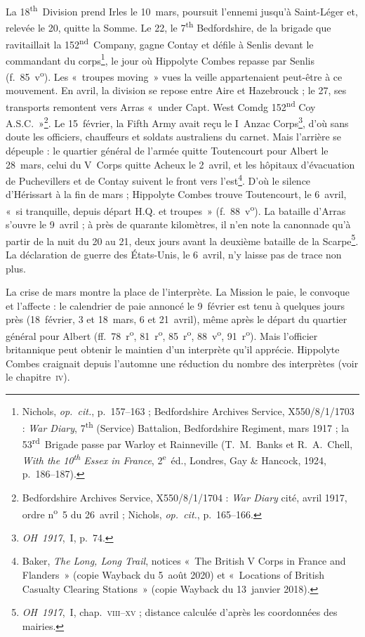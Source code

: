 La 18\textsuperscript{th}~Division prend Irles le 10~mars, poursuit l'ennemi jusqu'à Saint-Léger et, relevée le 20, quitte la Somme. Le 22, le 7\textsuperscript{th} Bedfordshire, de la brigade que ravitaillait la 152\textsuperscript{nd}~Company, gagne Contay et défile à Senlis devant le commandant du corps\footnote{Nichols, \textit{op.~cit.}, p.~157--163 ; Bedfordshire Archives Service, X550/8/1/1703 : \textit{War Diary}, 7\textsuperscript{th} (Service) Battalion, Bedfordshire Regiment, mars 1917 ; la 53\textsuperscript{rd}~Brigade passe par Warloy et Rainneville (T.~M.~Banks et R.~A.~Chell, \textit{With the 10\textsuperscript{th} Essex in France}, 2\textsuperscript{e}~éd., Londres, Gay \& Hancock, 1924, p.~186--187).}, le jour où Hippolyte Combes repasse par Senlis (f.~85~v\textsuperscript{o}). Les «~troupes moving~» vues la veille appartenaient peut-être à ce mouvement. En avril, la division se repose entre Aire et Hazebrouck ; le 27, ses transports remontent vers Arras «~under Capt. West Comdg 152\textsuperscript{nd} Coy A.S.C.~»\footnote{Bedfordshire Archives Service, X550/8/1/1704 : \textit{War Diary} cité, avril 1917, ordre n\textsuperscript{o}~5 du 26~avril ; Nichols, \textit{op.~cit.}, p.~165--166.}. Le 15~février, la Fifth Army avait reçu le I~Anzac Corps\footnote{\textit{OH~1917},~I, p.~74.}, d'où sans doute les officiers, chauffeurs et soldats australiens du carnet. Mais l'arrière se dépeuple : le quartier général de l'armée quitte Toutencourt pour Albert le 28~mars, celui du V~Corps quitte Acheux le 2~avril, et les hôpitaux d'évacuation de Puchevillers et de Contay suivent le front vers l'est\footnote{Baker, \textit{The Long, Long Trail}, notices «~The British V Corps in France and Flanders~» (copie Wayback du 5~août 2020) et «~Locations of British Casualty Clearing Stations~» (copie Wayback du 13~janvier 2018).}. D'où le silence d'Hérissart à la fin de mars ; Hippolyte Combes trouve Toutencourt, le 6~avril, «~si tranquille, depuis départ H.Q. et troupes~» (f.~88~v\textsuperscript{o}). La bataille d'Arras s'ouvre le 9~avril ; à près de quarante kilomètres, il n'en note la canonnade qu'à partir de la nuit du 20 au 21, deux jours avant la deuxième bataille de la Scarpe\footnote{\textit{OH~1917},~I, chap.~\textsc{viii}--\textsc{xv} ; distance calculée d'après les coordonnées des mairies.}. La déclaration de guerre des États-Unis, le 6~avril, n'y laisse pas de trace non plus.

La crise de mars montre la place de l'interprète. La Mission le paie, le convoque et l'affecte : le calendrier de paie annoncé le 9~février est tenu à quelques jours près (18~février, 3 et 18~mars, 6 et 21~avril), même après le départ du quartier général pour Albert (ff.~78~r\textsuperscript{o}, 81~r\textsuperscript{o}, 85~r\textsuperscript{o}, 88~v\textsuperscript{o}, 91~r\textsuperscript{o}). Mais l'officier britannique peut obtenir le maintien d'un interprète qu'il apprécie. Hippolyte Combes craignait depuis l'automne une réduction du nombre des interprètes (voir le chapitre~\textsc{iv}).

